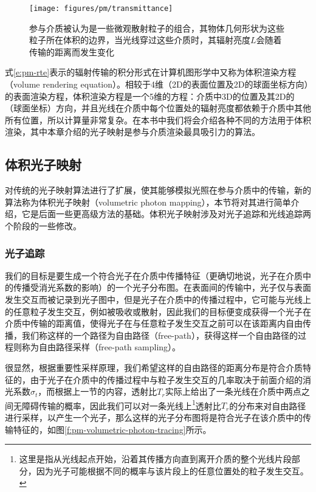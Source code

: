 \begin{figure}
\begin{center}
	\texttt{[image: figures/pm/transmittance]}
\end{center}
	\caption{参与介质被认为是一些微观散射粒子的组合，其物体几何形状为这些粒子所在体积的边界，当光线穿过这些介质时，其辐射亮度$L$会随着传输的距离而发生变化}
	\label{f:pm-transmittance}
\end{figure}

式\ref{e:pm-rte}表示的辐射传输的积分形式在计算机图形学中又称为体积渲染方程（volume rendering equation）。相较于4维（2D的表面位置及2D的球面坐标方向）的表面渲染方程，体积渲染方程是一个5维的方程：介质中3D的位置及其2D的（球面坐标）方向，并且光线在介质中每个位置处的辐射亮度都依赖于介质中其他所有位置，所以计算量非常复杂。在本书中我们将会介绍各种不同的方法用于体积渲染，其中本章介绍的光子映射是参与介质渲染最具吸引力的算法。





\subsection{体积光子映射}\label{sec:pm-volumetric-phptpn-mapping}
\cite{a:EfficientSimulationofLightTransportinSceneswithParticipatingMediausingPhotonMaps}对传统的光子映射算法进行了扩展，使其能够模拟光照在参与介质中的传输，新的算法称为体积光子映射（volumetric photon mapping），本节将对其进行简单介绍，它是后面一些更高级方法的基础。体积光子映射涉及对光子追踪和光线追踪两个阶段的一些修改。



\subsubsection{光子追踪}
我们的目标是要生成一个符合光子在介质中传播特征（更确切地说，光子在介质中的传播受消光系数的影响）的一个光子分布图。在表面间的传输中，光子仅与表面发生交互而被记录到光子图中，但是光子在介质中的传播过程中，它可能与光线上的任意粒子发生交互，例如被吸收或散射，因此我们的目标便变成获得一个光子在介质中传输的距离值，使得光子在与任意粒子发生交互之前可以在该距离内自由传播，我们称这样的一个路径为自由路径（free-path），获得这样一个自由路径的过程则称为自由路径采样（free-path sampling）。

很显然，根据重要性采样原理，我们希望这样的自由路径的距离分布是符合介质特征的，由于光子在介质中的传播过程中与粒子发生交互的几率取决于前面介绍的消光系数$\sigma_t$，而根据上一节的内容，透射比$T_r$实际上给出了一条光线在介质中两点之间无障碍传输的概率，因此我们可以对一条光线上\footnote{这里是指从光线起点开始，沿着其传播方向直到离开介质的整个光线片段部分，因为光子可能根据不同的概率与该片段上的任意位置处的粒子发生交互。}透射比$T_r$的分布来对自由路径进行采样，以产生一个光子，那么这样的光子分布图将是符合光子在该介质中的传输特征的，如图\ref{f:pm-volumetric-photon-tracing}所示。


